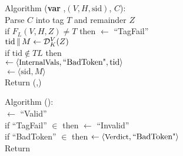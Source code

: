 \begin{figure}
{\medskip
Algorithm ({\bf var} ,$(V,H,\mathrm{sid})$, $C$):\\
\nudge Parse $C$ into tag $T$ and remainder $Z$\\ 
\nudge if $F_L(V,H,Z) \neq T$ then  $\gets$ ``TagFail''\\
\nudge $\mathrm{tid} \,\|\, M \gets \mathcal{D}_K^{V}(Z)$\\
\nudge if $\mathrm{tid}\not\in \mathit{TL}$ then\\
\nudge\nudge {} $\gets \langle
\textrm{\small InternalVals}, \mbox{``BadToken"}, \mathrm{tid} \rangle$\\
\nudge {} $\gets \langle \mathrm{sid}, M \rangle$\\
\nudge Return (,)

\medskip
Algorithm ():\\
\nudge {} $\gets$ ``Valid''\\
\nudge if ``TagFail'' $\in$  then  $\gets$ ``Invalid''\\
\nudge if ``BadToken'' $\in$  then  $\gets \langle
\textrm{\small Verdict},\mbox{``BadToken"} \rangle$\\
\nudge Return 

}
\end{figure}
